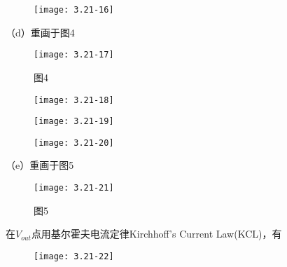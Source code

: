 \begin{figure}[H] %
	\begin{minipage}{\linewidth}
		\texttt{[image: 3.21-16]}
	\end{minipage}
\end{figure}

\scalebox{3}{（d）}

（d）重画于图4

\begin{figure}[H] %
	\begin{minipage}{\linewidth}
		\texttt{[image: 3.21-17]}
	\end{minipage}
	\caption*{图4} %
\end{figure}

\begin{figure}[H] %
	\begin{minipage}{\linewidth}
		\texttt{[image: 3.21-18]}
	\end{minipage}
\end{figure}

\begin{figure}[H] %
	\begin{minipage}{\linewidth}
		\texttt{[image: 3.21-19]}
	\end{minipage}
\end{figure}

\begin{figure}[H] %
	\begin{minipage}{\linewidth}
		\texttt{[image: 3.21-20]}
	\end{minipage}
\end{figure}

\scalebox{3}{（e）}

（e）重画于图5

\begin{figure}[H] %
	\begin{minipage}{\linewidth}
		\texttt{[image: 3.21-21]}
	\end{minipage}
	\caption*{图5} %
\end{figure}

在$V_{out}$点用基尔霍夫电流定律Kirchhoff’s Current Law(KCL)，有

\begin{figure}[H] %
	\begin{minipage}{\linewidth}
		\texttt{[image: 3.21-22]}
	\end{minipage}
\end{figure}


